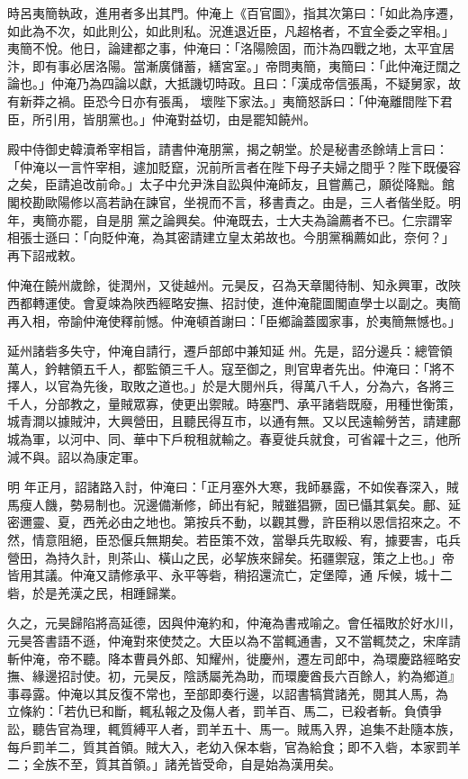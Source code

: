 \begin{pinyinscope}
 時呂夷簡執政，進用者多出其門。仲淹上《百官圖》，指其次第曰：「如此為序遷，如此為不次，如此則公，如此則私。況進退近臣，凡超格者，不宜全委之宰相。」夷簡不悅。他日，論建都之事，仲淹曰：「洛陽險固，而汴為四戰之地，太平宜居汴，即有事必居洛陽。當漸廣儲蓄，繕宮室。」帝問夷簡，夷簡曰：「此仲淹迂闊之論也。」仲淹乃為四論以獻，大抵譏切時政。且曰：「漢成帝信張禹，不疑舅家，故有新莽之禍。臣恐今日亦有張禹，
 壞陛下家法。」夷簡怒訴曰：「仲淹離間陛下君臣，所引用，皆朋黨也。」仲淹對益切，由是罷知饒州。



 殿中侍御史韓瀆希宰相旨，請書仲淹朋黨，揭之朝堂。於是秘書丞餘靖上言曰：「仲淹以一言忤宰相，遽加貶竄，況前所言者在陛下母子夫婦之間乎？陛下既優容之矣，臣請追改前命。」太子中允尹洙自訟與仲淹師友，且嘗薦己，願從降黜。館閣校勘歐陽修以高若訥在諫官，坐視而不言，移書責之。由是，三人者偕坐貶。明年，夷簡亦罷，自是朋
 黨之論興矣。仲淹既去，士大夫為論薦者不已。仁宗謂宰相張士遜曰：「向貶仲淹，為其密請建立皇太弟故也。今朋黨稱薦如此，奈何？」再下詔戒敕。



 仲淹在饒州歲餘，徙潤州，又徙越州。元昊反，召為天章閣待制、知永興軍，改陜西都轉運使。會夏竦為陜西經略安撫、招討使，進仲淹龍圖閣直學士以副之。夷簡再入相，帝諭仲淹使釋前憾。仲淹頓首謝曰：「臣鄉論蓋國家事，於夷簡無憾也。」



 延州諸砦多失守，仲淹自請行，遷戶部郎中兼知延
 州。先是，詔分邊兵：總管領萬人，鈐轄領五千人，都監領三千人。寇至御之，則官卑者先出。仲淹曰：「將不擇人，以官為先後，取敗之道也。」於是大閱州兵，得萬八千人，分為六，各將三千人，分部教之，量賊眾寡，使更出禦賊。時塞門、承平諸砦既廢，用種世衡策，城青澗以據賊沖，大興營田，且聽民得互市，以通有無。又以民遠輸勞苦，請建鄜城為軍，以河中、同、華中下戶稅租就輸之。春夏徙兵就食，可省糴十之三，他所減不與。詔以為康定軍。



 明
 年正月，詔諸路入討，仲淹曰：「正月塞外大寒，我師暴露，不如俟春深入，賊馬瘦人饑，勢易制也。況邊備漸修，師出有紀，賊雖猖獗，固已懾其氣矣。鄜、延密邇靈、夏，西羌必由之地也。第按兵不動，以觀其釁，許臣稍以恩信招來之。不然，情意阻絕，臣恐偃兵無期矣。若臣策不效，當舉兵先取綏、宥，據要害，屯兵營田，為持久計，則茶山、橫山之民，必挈族來歸矣。拓疆禦寇，策之上也。」帝皆用其議。仲淹又請修承平、永平等砦，稍招還流亡，定堡障，通
 斥候，城十二砦，於是羌漢之民，相踵歸業。



 久之，元昊歸陷將高延德，因與仲淹約和，仲淹為書戒喻之。會任福敗於好水川，元昊答書語不遜，仲淹對來使焚之。大臣以為不當輒通書，又不當輒焚之，宋庠請斬仲淹，帝不聽。降本曹員外郎、知耀州，徙慶州，遷左司郎中，為環慶路經略安撫、緣邊招討使。初，元昊反，陰誘屬羌為助，而環慶酋長六百餘人，約為鄉道』事尋露。仲淹以其反復不常也，至部即奏行邊，以詔書犒賞諸羌，閱其人馬，為
 立條約：「若仇已和斷，輒私報之及傷人者，罰羊百、馬二，已殺者斬。負債爭訟，聽告官為理，輒質縛平人者，罰羊五十、馬一。賊馬入界，追集不赴隨本族，每戶罰羊二，質其首領。賊大入，老幼入保本砦，官為給食；即不入砦，本家罰羊二；全族不至，質其首領。」諸羌皆受命，自是始為漢用矣。




\end{pinyinscope}
